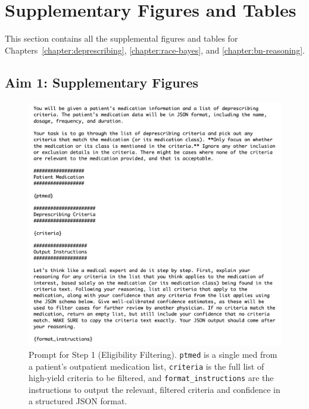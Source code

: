 \chapter{Supplementary Figures and Tables}

This section contains all the supplemental figures and tables for Chapters~\ref{chapter:deprescribing}, \ref{chapter:race-bayes}, and \ref{chapter:bn-reasoning}. 

\section{Aim 1: Supplementary Figures}

\begin{figure}[ht!]
	\centering
	\includegraphics[width=\textwidth] {figures/aim1/step1_prompt.png}
	\caption{Prompt for Step 1 (Eligibility Filtering). \texttt{ptmed} is a single med from a patient’s outpatient medication list, \texttt{criteria} is the full list of high-yield criteria to be filtered, and \texttt{format\_instructions} are the instructions to output the relevant, filtered criteria and confidence in a structured JSON format.} \label{fig:aim1-step1-prompt}
\end{figure}

